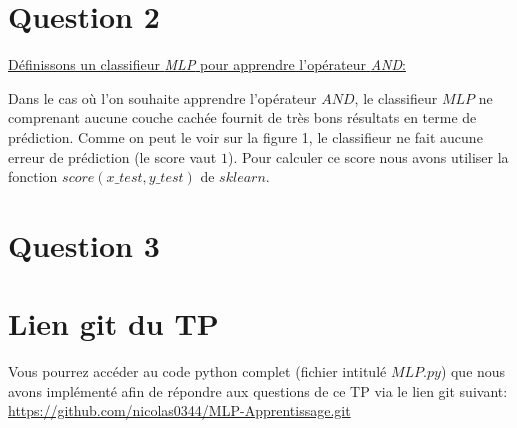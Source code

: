 \documentclass[a4paper,french,10pt]{article}
\begin{document}
	\section{Question 2}
	
	\underline{Définissons un classifieur \textit{MLP} pour apprendre l’opérateur \textit{AND}:}
	
%	
	
	Dans le cas où l'on souhaite apprendre l'opérateur $AND$, le classifieur $MLP$ ne comprenant aucune couche cachée fournit de très bons résultats en terme de prédiction. Comme on peut le voir sur la figure 1, le classifieur ne fait aucune erreur de prédiction (le score vaut $1$). Pour calculer ce score nous avons utiliser la fonction $score(x\_test, y\_test)$ de $sklearn$.
	\section{Question 3}
	
	
	\section{Lien git du TP}
	Vous pourrez accéder au code python complet (fichier intitulé $MLP.py$) que nous avons implémenté afin de répondre aux questions de ce TP via le lien git suivant:\\
	\url{https://github.com/nicolas0344/MLP-Apprentissage.git}
	
\end{document}
